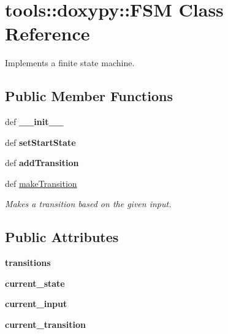 \hypertarget{classtools_1_1doxypy_1_1FSM}{
\section{tools::doxypy::FSM Class Reference}
\label{classtools_1_1doxypy_1_1FSM}
}
Implements a finite state machine.  


\subsection*{Public Member Functions}
\begin{CompactItemize}
\item 
\hypertarget{classtools_1_1doxypy_1_1FSM_3a7e99c01a55c7b51716223bdcbf4f09}{
def \textbf{\_\-\_\-init\_\-\_\-}}
\label{classtools_1_1doxypy_1_1FSM_3a7e99c01a55c7b51716223bdcbf4f09}

\item 
\hypertarget{classtools_1_1doxypy_1_1FSM_26b92e58bb51352633a59b986f1d7ed8}{
def \textbf{setStartState}}
\label{classtools_1_1doxypy_1_1FSM_26b92e58bb51352633a59b986f1d7ed8}

\item 
\hypertarget{classtools_1_1doxypy_1_1FSM_399f96a5cd0fb809675d8d0358173e14}{
def \textbf{addTransition}}
\label{classtools_1_1doxypy_1_1FSM_399f96a5cd0fb809675d8d0358173e14}

\item 
def \hyperlink{classtools_1_1doxypy_1_1FSM_fd6f235b6e8f7bc9ad65574d3d626fd9}{makeTransition}
\begin{CompactList}\small\item\em Makes a transition based on the given input. \item\end{CompactList}\end{CompactItemize}
\subsection*{Public Attributes}
\begin{CompactItemize}
\item 
\hypertarget{classtools_1_1doxypy_1_1FSM_178e6451e7c4df649180afbc2585e561}{
\textbf{transitions}}
\label{classtools_1_1doxypy_1_1FSM_178e6451e7c4df649180afbc2585e561}

\item 
\hypertarget{classtools_1_1doxypy_1_1FSM_b964ab2171ee650260f1ef2041fa8680}{
\textbf{current\_\-state}}
\label{classtools_1_1doxypy_1_1FSM_b964ab2171ee650260f1ef2041fa8680}

\item 
\hypertarget{classtools_1_1doxypy_1_1FSM_9bbf8d8b267c39e8b8b8055393f52e53}{
\textbf{current\_\-input}}
\label{classtools_1_1doxypy_1_1FSM_9bbf8d8b267c39e8b8b8055393f52e53}

\item 
\hypertarget{classtools_1_1doxypy_1_1FSM_ee547a8ac8a2e13c735fff54cbe391a1}{
\textbf{current\_\-transition}}
\label{classtools_1_1doxypy_1_1FSM_ee547a8ac8a2e13c735fff54cbe391a1}

\end{CompactItemize}


